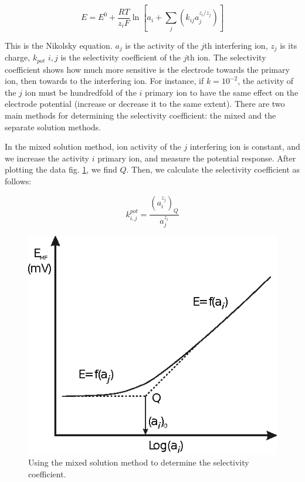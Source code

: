 \begin{equation}
\label{eq:nikolsky}
E=E^0 + \frac{RT}{z_iF} \ln \left [ a_i + \sum_{j} \left ( k_{ij}a_j^{z_i/z_j} \right ) \right ]
\end{equation}

This is the Nikolsky equation. $a_j$ is the activity of the $j$th interfering ion, $z_j$ is its charge, $k_{pot}$ $i, j$ is the selectivity coefficient of the $j$th ion.
The selectivity coefficient shows how much more sensitive is the electrode towards the primary ion, then towards to the interfering ion.
For instance, if $k = 10^{-2}$, the activity of the $j$ ion must be hundredfold of the $i$ primary ion to have the same effect on the electrode potential (increase or decrease it to the same extent).
There are two main methods for determining the selectivity coefficient: the mixed and the separate solution methods.

In the mixed solution method, ion activity of the $j$ interfering ion is constant, and we increase the activity $i$ primary ion, and measure the potential response.
After plotting the data fig. \ref{fig:Q}, we find $Q$. Then, we calculate the selectivity coefficient as follows:

\begin{equation}
\label{eq:szel1}
	k_{i,j}^{pot}
	=
	\frac{(a_i^{z_j})_Q}{a_j^{z_i}}
\end{equation}


\begin{figure}
\centering
\includegraphics{fig/ion1.eps}
\caption{Using the mixed solution method to determine the selectivity coefficient.}
\label{fig:Q}
\end{figure}

